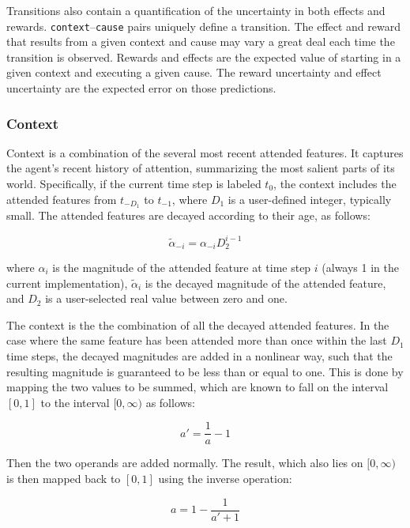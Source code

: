Transitions also contain a quantification of the uncertainty in both effects and rewards. \texttt{context}--\texttt{cause} pairs uniquely define a transition. The effect and reward that results from a given context and cause may vary a great deal each time the transition is observed. Rewards and effects are the expected value of starting in a given context and executing a given cause. The reward uncertainty and effect uncertainty are the expected error on those predictions.

 
\subsubsection{Context}
Context is a combination of the several most recent attended features. It captures the agent's recent history of attention, summarizing the most salient parts of its world.
Specifically, if the current time step is labeled $t_{0}$, the context includes the attended features from $t_{-D_1}$ to $t_{-1}$, where $D_1$ is a user-defined integer, typically small. The attended features are decayed according to their age, as follows:

\begin{equation}
\tilde{\alpha}_{-i} =  \alpha_{-i} D_2^{i-1}
\end{equation}

where $ \alpha_i $ is the magnitude of the attended feature at time step $i$ (always 1 in the current implementation), $\tilde{\alpha}_{i}$ is the decayed magnitude of the attended feature, and $D_2$ is a user-selected real value between zero and one.

The context is the the combination of all the decayed attended features. In the case where the same feature has been attended more than once within the last $D_1$ time steps, the decayed magnitudes are added in a nonlinear way, such that the resulting magnitude is guaranteed to be less than or equal to one. This is done by mapping the two values to be summed, which are known to fall on the interval $[0,1]$ to the interval $[0, \infty)$ as follows:

\begin{equation}
a' = \frac{1}{a} - 1
\label{bounded_sum_map}
\end{equation}

Then the two operands are added normally. The result, which also lies on $[0, \infty)$ is then mapped back to $[0,1]$ using the inverse operation:

\begin{equation}
a = 1 - \frac{1}{a' + 1} 
\label{bounded_sum_unmap}
\end{equation}

